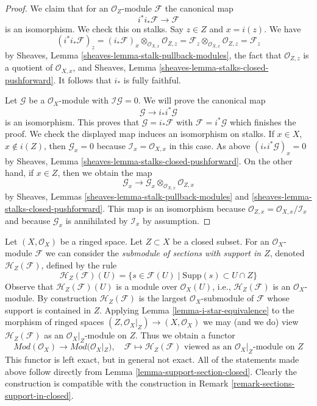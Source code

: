 \begin{proof}
We claim that for an $\mathcal{O}_Z$-module $\mathcal{F}$ the canonical map
$$
i^*i_*\mathcal{F} \longrightarrow \mathcal{F}
$$
is an isomorphism. We check this on stalks. Say $z \in Z$ and $x = i(z)$.
We have
$$
(i^*i_*\mathcal{F})_z =
(i_*\mathcal{F})_x \otimes_{\mathcal{O}_{X, x}} \mathcal{O}_{Z, z} =
\mathcal{F}_z \otimes_{\mathcal{O}_{X, x}} \mathcal{O}_{Z, z} =
\mathcal{F}_z
$$
by Sheaves, Lemma \ref{sheaves-lemma-stalk-pullback-modules},
the fact that $\mathcal{O}_{Z, z}$ is a quotient of $\mathcal{O}_{X, x}$, and
Sheaves, Lemma \ref{sheaves-lemma-stalks-closed-pushforward}.
It follows that $i_*$ is fully faithful.

\medskip\noindent
Let $\mathcal{G}$ be a $\mathcal{O}_X$-module with
$\mathcal{I}\mathcal{G} = 0$. We will prove the canonical map
$$
\mathcal{G} \longrightarrow i_*i^*\mathcal{G}
$$
is an isomorphism. This proves that $\mathcal{G} = i_*\mathcal{F}$
with $\mathcal{F} = i^*\mathcal{G}$ which finishes the proof.
We check the displayed map induces an isomorphism on stalks.
If $x \in X$, $x \not \in i(Z)$, then $\mathcal{G}_x = 0$
because $\mathcal{I}_x = \mathcal{O}_{X, x}$ in this
case. As above $(i_*i^*\mathcal{G})_x = 0$ by
Sheaves, Lemma \ref{sheaves-lemma-stalks-closed-pushforward}.
On the other hand, if $x \in Z$, then we obtain the map
$$
\mathcal{G}_x
\longrightarrow
\mathcal{G}_x \otimes_{\mathcal{O}_{X, x}} \mathcal{O}_{Z, x}
$$
by Sheaves, Lemmas \ref{sheaves-lemma-stalk-pullback-modules} and
\ref{sheaves-lemma-stalks-closed-pushforward}. This map is an isomorphism
because $\mathcal{O}_{Z, x} = \mathcal{O}_{X, x}/\mathcal{I}_x$
and because $\mathcal{G}_x$ is annihilated by $\mathcal{I}_x$ by assumption.
\end{proof}

\begin{remark}
\label{remark-sections-support-in-closed-modules}
Let $(X, \mathcal{O}_X)$ be a ringed space. Let $Z \subset X$ be
a closed subset. For an $\mathcal{O}_X$-module $\mathcal{F}$ we can
consider the {\it submodule of sections with support in $Z$}, denoted
$\mathcal{H}_Z(\mathcal{F})$, defined by the rule
$$
\mathcal{H}_Z(\mathcal{F})(U) =
\{s \in \mathcal{F}(U) \mid \text{Supp}(s) \subset U \cap Z\}
$$
Observe that $\mathcal{H}_Z(\mathcal{F})(U)$ is a module over
$\mathcal{O}_X(U)$, i.e., $\mathcal{H}_Z(\mathcal{F})$ is an
$\mathcal{O}_X$-module. By construction $\mathcal{H}_Z(\mathcal{F})$
is the largest $\mathcal{O}_X$-submodule of $\mathcal{F}$ whose support is
contained in $Z$.
Applying Lemma \ref{lemma-i-star-equivalence} to
the morphism of ringed spaces $(Z, \mathcal{O}_X|_Z) \to (X, \mathcal{O}_X)$ we
may (and we do) view
$\mathcal{H}_Z(\mathcal{F})$ as an $\mathcal{O}_X|_Z$-module on $Z$.
Thus we obtain a functor
$$
\textit{Mod}(\mathcal{O}_X) \longrightarrow \textit{Mod}(\mathcal{O}_X|_Z),
\quad
\mathcal{F} \longmapsto \mathcal{H}_Z(\mathcal{F})
\text{ viewed as an }\mathcal{O}_X|_Z\text{-module on }Z
$$
This functor is left exact, but in general not exact.
All of the statements made above follow directly from
Lemma \ref{lemma-support-section-closed}.
Clearly the construction is compatible with the construction in
Remark \ref{remark-sections-support-in-closed}.
\end{remark}

